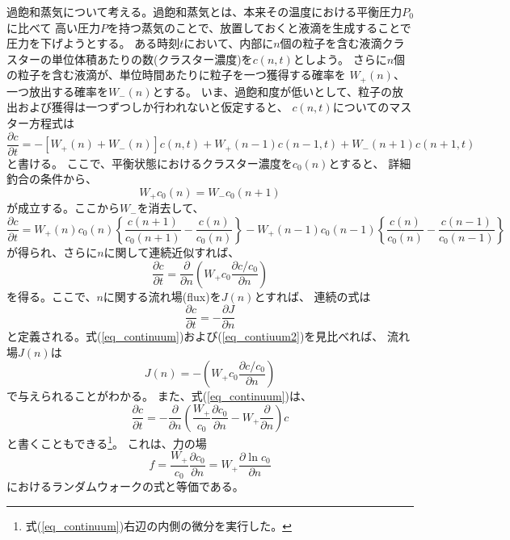 \documentclass{jarticle}
\begin{document}
過飽和蒸気について考える。過飽和蒸気とは、本来その温度における平衡圧力$P_0$に比べて
高い圧力$P$を持つ蒸気のことで、放置しておくと液滴を生成することで圧力を下げようとする。
ある時刻$t$において、内部に$n$個の粒子を含む液滴クラスターの単位体積あたりの数(クラスター濃度)を$c(n,t)$としよう。
さらに$n$個の粒子を含む液滴が、単位時間あたりに粒子を一つ獲得する確率を
$W_+(n)$、一つ放出する確率を$W_-(n)$とする。
いま、過飽和度が低いとして、粒子の放出および獲得は一つずつしか行われないと仮定すると、
$c(n,t)$についてのマスター方程式は
\begin{equation}
    \frac{\partial c}{\partial t} = - \left[ W_+(n) + W_-(n) \right] c(n,t)
    + W_+(n-1)  c(n-1,t) + W_-(n+1) c(n+1,t)
\end{equation}
と書ける。
ここで、平衡状態におけるクラスター濃度を$c_0(n)$とすると、
詳細釣合の条件から、
\begin{equation}
    W_+ c_0(n) = W_- c_0(n+1)
\end{equation}
が成立する。ここから$W_-$を消去して、
\begin{equation}
    \frac{\partial c}{\partial t} = W_+(n) c_0(n)
    \left\{
    \frac{c(n+1)}{c_0(n+1)} - \frac{c(n)}{c_0(n)}
    \right\}
    - W_+(n-1) c_0(n-1)
    \left\{
    \frac{c(n)}{c_0(n)} - \frac{c(n-1)}{c_0(n-1)}
    \right\}
\end{equation}
が得られ、さらに$n$に関して連続近似すれば、
\begin{equation}
    \frac{\partial c}{\partial t} = \frac{\partial }{\partial n}
    \left(W_+ c_0
    \frac{\partial c/c_0}{\partial n}
    \right)  \label{eq_continuum}
\end{equation}
を得る。ここで、$n$に関する流れ場(flux)を$J(n)$とすれば、
連続の式は
\begin{equation}
    \frac{\partial c}{\partial t} = -\frac{\partial J}{\partial n} \label{eq_contiuum2}
\end{equation}
と定義される。式(\ref{eq_continuum})および(\ref{eq_contiuum2})を見比べれば、
流れ場$J(n)$は
\begin{equation}
    J(n) =-\left(W_+ c_0
    \frac{\partial c/c_0}{\partial n}
    \right)
\end{equation}
で与えられることがわかる。
また、式(\ref{eq_continuum})は、
\begin{equation}
    \frac{\partial c}{\partial t} = - \frac{\partial}{\partial n}
    \left(
    \displaystyle \frac{W_+}{c_0} \frac{\partial c_0}{\partial n}
    - W_+ \frac{\partial}{\partial n}
    \right) c
\end{equation}
と書くこともできる\footnote{式(\ref{eq_continuum})右辺の内側の微分を実行した。}。
これは、力の場
$$
    f = \frac{W_+}{c_0} \frac{\partial c_0}{\partial n} = W_+ \frac{\partial \ln c_0}{\partial n} \label{eq_f}
$$
におけるランダムウォークの式と等価である。
\end{document}
